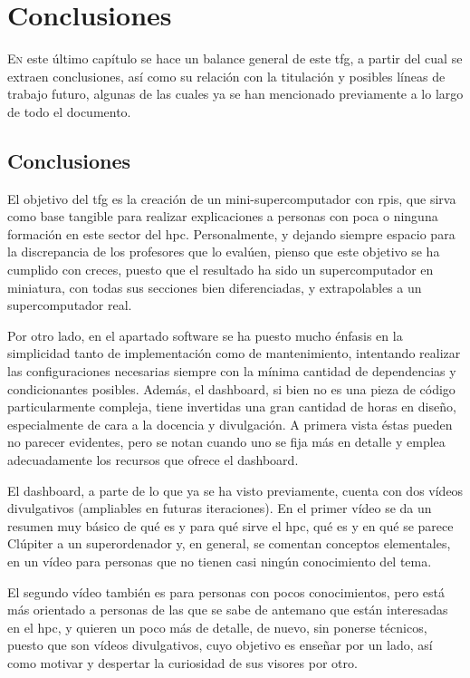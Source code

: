 \chapter{Conclusiones}
\label{chap:conclusiones}

\lettrine{E}{n} este último capítulo se hace un balance general de este \acrlong{tfg}, a partir del cual se extraen conclusiones, así como su relación con la titulación y posibles líneas de trabajo futuro, algunas de las cuales ya se han mencionado previamente a lo largo de todo el documento.

\section{Conclusiones}
El objetivo del \acrshort{tfg} es la creación de un mini-supercomputador con \acrlong{rpi}s, que sirva como base tangible para realizar explicaciones a personas con poca o ninguna formación en este sector del \acrshort{hpc}. Personalmente, y dejando siempre espacio para la discrepancia de los profesores que lo evalúen, pienso que este objetivo se ha cumplido con creces, puesto que el resultado ha sido un supercomputador en miniatura, con todas sus secciones bien diferenciadas, y extrapolables a un supercomputador real. 

Por otro lado, en el apartado software se ha puesto mucho énfasis en la simplicidad tanto de implementación como de mantenimiento, intentando realizar las configuraciones necesarias siempre con la mínima cantidad de dependencias y condicionantes posibles. Además, el dashboard, si bien no es una pieza de código particularmente compleja, tiene invertidas una gran cantidad de horas en diseño, especialmente de cara a la docencia y divulgación. A primera vista éstas pueden no parecer evidentes, pero se notan cuando uno se fija más en detalle y emplea adecuadamente los recursos que ofrece el dashboard.

El dashboard, a parte de lo que ya se ha visto previamente, cuenta con dos vídeos divulgativos (ampliables en futuras iteraciones). En el primer vídeo se da un resumen muy básico de qué es y para qué sirve el \acrshort{hpc}, qué es y en qué se parece Clúpiter a un superordenador y, en general, se comentan conceptos elementales, en un vídeo para personas que no tienen casi ningún conocimiento del tema.

El segundo vídeo también es para personas con pocos conocimientos, pero está más orientado a personas de las que se sabe de antemano que están interesadas en el \acrshort{hpc}, y quieren un poco más de detalle, de nuevo, sin ponerse técnicos, puesto que son vídeos divulgativos, cuyo objetivo es enseñar por un lado, así como motivar y despertar la curiosidad de sus visores por otro.


